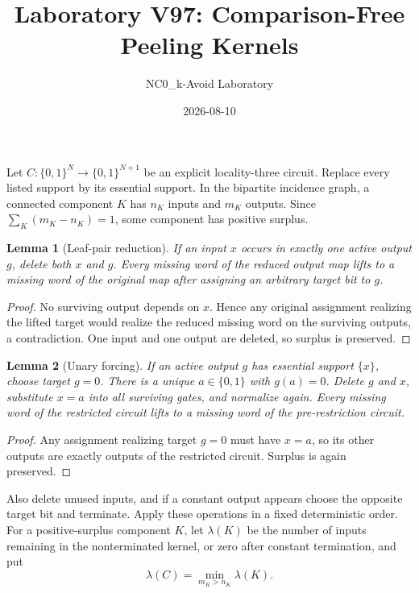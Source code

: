 \documentclass[11pt]{article}
\newtheorem{lemma}{Lemma}
\newcommand{\bits}{\{0,1\}}
\begin{document}
\title{Laboratory V97: Comparison-Free Peeling Kernels}
\author{NC0\_k-Avoid Laboratory}
\date{2026-08-10}
\maketitle

Let $C:\bits^N\to\bits^{N+1}$ be an explicit locality-three circuit.  Replace
every listed support by its essential support.  In the bipartite incidence graph,
a connected component $K$ has $n_K$ inputs and $m_K$ outputs.  Since
$\sum_K(m_K-n_K)=1$, some component has positive surplus.

\begin{lemma}[Leaf-pair reduction]
If an input $x$ occurs in exactly one active output $g$, delete both $x$ and
$g$.  Every missing word of the reduced output map lifts to a missing word of
the original map after assigning an arbitrary target bit to $g$.
\end{lemma}
\begin{proof}
No surviving output depends on $x$.  Hence any original assignment realizing
the lifted target would realize the reduced missing word on the surviving
outputs, a contradiction.  One input and one output are deleted, so surplus is
preserved.
\end{proof}

\begin{lemma}[Unary forcing]
If an active output $g$ has essential support $\{x\}$, choose target $g=0$.
There is a unique $a\in\bits$ with $g(a)=0$.  Delete $g$ and $x$, substitute
$x=a$ into all surviving gates, and normalize again.  Every missing word of the
restricted circuit lifts to a missing word of the pre-restriction circuit.
\end{lemma}
\begin{proof}
Any assignment realizing target $g=0$ must have $x=a$, so its other outputs are
exactly outputs of the restricted circuit.  Surplus is again preserved.
\end{proof}

Also delete unused inputs, and if a constant output appears choose the opposite
target bit and terminate.  Apply these operations in a fixed deterministic
order.  For a positive-surplus component $K$, let $\lambda(K)$ be the number of
inputs remaining in the nonterminated kernel, or zero after constant
termination, and put
\[
 \lambda(C)=\min_{m_K>n_K}\lambda(K).
\]
\end{document}
